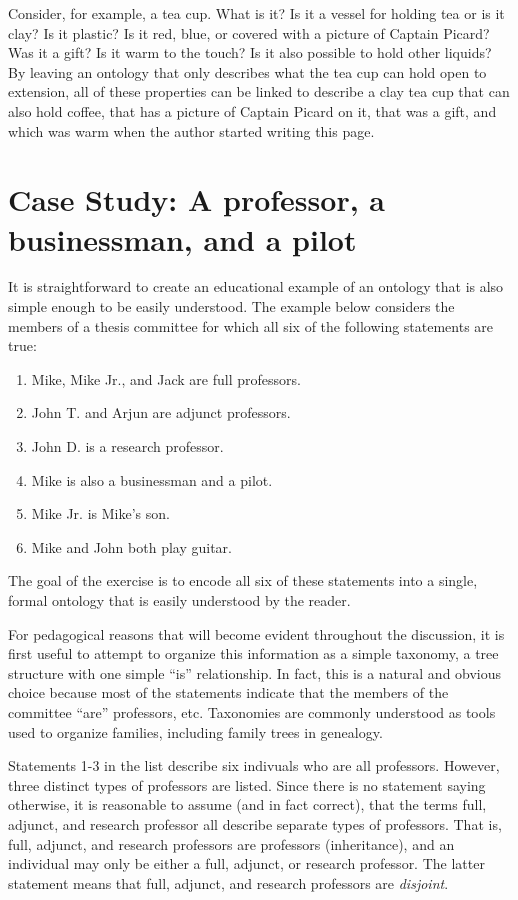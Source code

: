 Consider, for example, a tea cup. What is it? Is it a vessel for holding tea or
is it clay? Is it plastic? Is it red, blue, or covered with a picture of
Captain Picard? Was it a gift? Is it warm to the touch? Is it also possible to
hold other liquids? By leaving an ontology that only describes what the tea cup
can hold open to extension, all of these properties can be linked to describe a
clay tea cup that can also hold coffee, that has a picture of Captain Picard on
it, that was a gift, and which was warm when the author started writing this
page.

\section{Case Study: A professor, a businessman, and a pilot}
\label{case-study}

It is straightforward to create an educational example of an ontology that is
also simple enough to be easily understood. The example below considers the
members of a thesis committee for which all six of the following statements are
true:

\begin{enumerate}
\item Mike, Mike Jr., and Jack are full professors. %
\item John T. and Arjun are adjunct professors.     %
\item John D. is a research professor.              %
\item Mike is also a businessman and a pilot.       %
\item Mike Jr. is Mike's son.                       %
\item Mike and John both play guitar.               %
\end{enumerate}

The goal of the exercise is to encode all six of these statements into a single,
formal ontology that is easily understood by the reader.

For pedagogical reasons that will become evident throughout the discussion, it
is first useful to attempt to organize this information as a simple taxonomy, a
tree structure with one simple ``is'' relationship. In fact, this is a natural
and obvious choice because most of the statements indicate that the members of
the committee ``are'' professors, etc. Taxonomies are commonly understood as
tools used to organize families, including family trees in genealogy.

Statements 1-3 in the list describe six indivuals who are all professors.
However, three distinct types of professors are listed. Since there is no
statement saying otherwise, it is reasonable to assume (and in fact correct),
that the terms full, adjunct, and research professor all describe separate types
of professors. That is, full, adjunct, and research professors are professors
(inheritance), and an individual may only be either a full, adjunct, or research
professor. The latter statement means that full, adjunct, and research
professors are \textit{disjoint}. 

